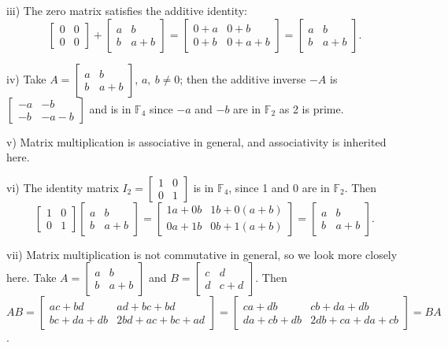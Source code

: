 \documentclass{amsart}
\begin{document}
	iii) The zero matrix satisfies the additive identity:
	$$\begin{bmatrix}
	0 & 0 \\
	0 & 0
	\end{bmatrix} + \begin{bmatrix}
	a & b \\
	b & a+b
	\end{bmatrix} =
	\begin{bmatrix}
	0+a & 0+b \\
	0+b & 0+a+b
	\end{bmatrix} = \begin{bmatrix}
	a & b \\
	b & a+b
	\end{bmatrix}.$$
	
	iv) Take $A = \begin{bmatrix}
	a & b \\
	b & a+b
	\end{bmatrix}$, $a,\ b \neq 0$; then the additive inverse $-A$ is $\begin{bmatrix}
	-a & -b \\
	-b & -a-b
	\end{bmatrix}$ and is in $\mathbb{F}_4$ since $-a$ and $-b$ are in $\mathbb{F}_2$ as 2 is prime.
	
	v) Matrix multiplication is associative in general, and associativity is inherited here.
	
	vi) The identity matrix $I_2 = \begin{bmatrix}
	1 & 0 \\
	0 & 1
	\end{bmatrix}$ is in $\mathbb{F}_4$, since 1 and 0 are in $\mathbb{F}_2$. Then $$\begin{bmatrix}
	1 & 0 \\
	0 & 1
	\end{bmatrix} \begin{bmatrix}
	a & b \\
	b & a+b
	\end{bmatrix} =
	\begin{bmatrix}
	1a+0b & 1b+0(a+b) \\
	0a+1b & 0b+1(a+b)
	\end{bmatrix} =\begin{bmatrix}
	a & b \\
	b & a+b
	\end{bmatrix}.$$
	
	vii) Matrix multiplication is not commutative in general, so we look more closely here. Take $A = \begin{bmatrix}
	a & b \\
	b & a+b
	\end{bmatrix}$ and $B = \begin{bmatrix}
	c & d \\
	d & c+d
	\end{bmatrix}.$
	Then $AB = \begin{bmatrix}
	ac+bd & ad +bc +bd \\
	bc+da+db & 2bd+ac+bc+ad
	\end{bmatrix} = \begin{bmatrix}
	ca+db & cb+da+db \\
	da+cb+db & 2db+ca+da+cb
	\end{bmatrix} = BA$.
	
\end{document}
